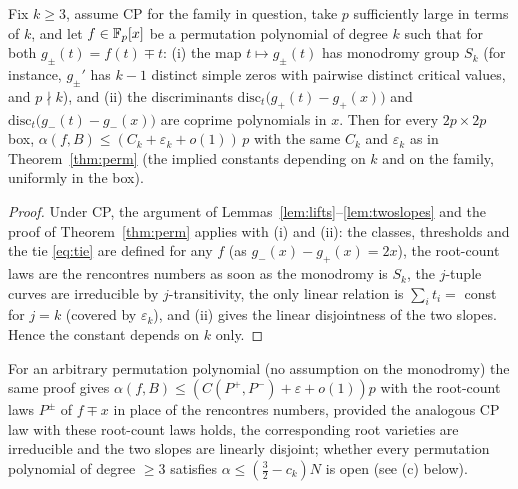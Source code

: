 \begin{corollary}\label{cor:permgen}
Fix $k\ge3$, assume CP for the family in question, take $p$ sufficiently large in terms of $k$, and let $f\in\mathbb{F}_p[x]$ be a permutation polynomial of degree $k$ such that for both $g_\pm(t)=f(t)\mp t$: (i) the map $t\mapsto g_\pm(t)$ has
monodromy group $S_k$ (for instance, $g_\pm'$ has $k-1$ distinct simple zeros with pairwise distinct critical values, and $p\nmid k$), and (ii) the
discriminants $\mathrm{disc}_t\bigl(g_+(t)-g_+(x)\bigr)$ and $\mathrm{disc}_t\bigl(g_-(t)-g_-(x)\bigr)$ are coprime polynomials in $x$.  Then for every
$2p\times2p$ box, $\alpha(f,B)\le(C_k+\varepsilon_k+o(1))\,p$ with the same $C_k$ and $\varepsilon_k$ as in Theorem~\ref{thm:perm} (the implied constants
depending on $k$ and on the family, uniformly in the box).
\end{corollary}
\begin{proof}
Under CP, the argument of Lemmas~\ref{lem:lifts}--\ref{lem:twoslopes} and the proof of Theorem~\ref{thm:perm} applies with (i) and (ii): the classes,
thresholds and the tie \eqref{eq:tie} are defined for any $f$ (as $g_-(x)-g_+(x)=2x$), the root-count laws are the rencontres numbers as soon as the
monodromy is $S_k$, the $j$-tuple curves are irreducible by $j$-transitivity, the only linear relation is $\sum_it_i=$ const for $j=k$ (covered by
$\varepsilon_k$), and (ii) gives the linear disjointness of the two slopes.  Hence the constant depends on $k$ only.
\end{proof}
For an arbitrary permutation polynomial (no assumption on the monodromy) the same proof gives $\alpha(f,B)\le(C(P^+,P^-)+\varepsilon+o(1))p$ with the
root-count laws $P^\pm$ of $f\mp x$ in place of the rencontres numbers, provided the analogous CP law with these root-count laws holds, the corresponding root varieties are irreducible and the two slopes are
linearly disjoint; whether every permutation polynomial of degree $\ge3$ satisfies $\alpha\le(\tfrac32-c_k)N$ is open (see (c) below).

